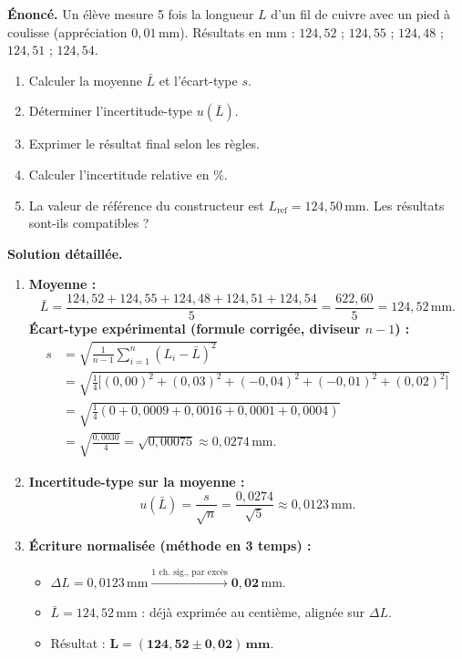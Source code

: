 \documentclass[11pt]{article}
\begin{document}
\begin{exoresolu}
\textbf{Énoncé.} Un élève mesure 5 fois la longueur $L$ d'un fil de cuivre avec un pied à coulisse (appréciation $0,01\,\text{mm}$). Résultats en mm : $124,52$ ; $124,55$ ; $124,48$ ; $124,51$ ; $124,54$.
\begin{enumerate}
    \item Calculer la moyenne $\bar{L}$ et l'écart-type $s$.
    \item Déterminer l'incertitude-type $u(\bar{L})$.
    \item Exprimer le résultat final selon les règles.
    \item Calculer l'incertitude relative en $\%$.
    \item La valeur de référence du constructeur est $L_{\text{ref}} = 124,50\,\text{mm}$. Les résultats sont-ils compatibles ?
\end{enumerate}
\tcblower
\textbf{Solution détaillée.}
\begin{enumerate}
    \item \textbf{Moyenne :}
    \[
    \bar{L} = \frac{124,52+124,55+124,48+124,51+124,54}{5} = \frac{622,60}{5} = 124,52\,\text{mm}.
    \]
    \textbf{Écart-type expérimental (formule corrigée, diviseur $n-1$) :}
    \begin{align*}
    s &= \sqrt{\frac{1}{n-1}\sum_{i=1}^n (L_i - \bar{L})^2} \\
      &= \sqrt{\frac{1}{4}\big[(0,00)^2 + (0,03)^2 + (-0,04)^2 + (-0,01)^2 + (0,02)^2\big]} \\
      &= \sqrt{\frac{1}{4}(0 + 0,0009 + 0,0016 + 0,0001 + 0,0004)} \\
      &= \sqrt{\frac{0,0030}{4}} = \sqrt{0,00075} \approx 0,0274\,\text{mm}.
    \end{align*}
    \item \textbf{Incertitude-type sur la moyenne :}
    \[
    u(\bar{L}) = \frac{s}{\sqrt{n}} = \frac{0,0274}{\sqrt{5}} \approx 0,0123\,\text{mm}.
    \]
    \item \textbf{Écriture normalisée (méthode en 3 temps) :}
    \begin{itemize}
        \item $\Delta L = 0,0123\,\text{mm} \xrightarrow{\text{1 ch. sig., par excès}} \mathbf{0,02}\,\text{mm}$.
        \item $\bar{L} = 124,52\,\text{mm}$ : déjà exprimée au centième, alignée sur $\Delta L$.
        \item Résultat : $\mathbf{L = (124,52 \pm 0,02)\,\text{mm}}$.

\end{itemize}
\end{enumerate}
\end{exoresolu}
\end{document}
